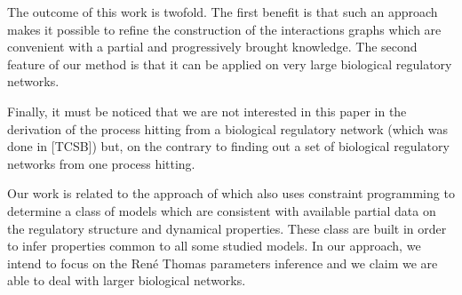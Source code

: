 The outcome of this work is twofold. The first benefit is that such an approach makes it possible to refine the construction of the interactions graphs which are convenient with a partial and progressively brought knowledge. The second feature of our method is that it can be applied on very large biological regulatory networks.

Finally, it must be noticed that we are not interested in this paper in the derivation of the process hitting from a biological regulatory network (which was done in [TCSB]) but, on the contrary to finding out a set of biological regulatory networks from one process hitting.

Our work is related to the approach of \cite{20646302,DBLP:conf/ipcat/CorblinFTCT12} which also uses constraint programming to determine a class of models which are consistent with available partial data on the regulatory structure and dynamical properties. These class are built in order to infer properties common to all some studied models. In our approach, we intend to focus on the Ren\'e Thomas parameters inference and we claim we are able to deal with larger biological networks.
 